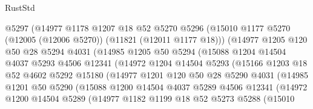 \begin{lexlean}{RustStd}
\begin{coremodule}
                    @5297
                    (@14977
                      @1178
                      @1207
                      @18
                      @52
                      @5270
                      @5296
                      (@15010 @1177 @5270 (@12005 (@12006 @5270)) (@11821 (@12011 @1177 @18)))
                      (@14977
                        @1205
                        @120
                        @50
                        @28
                        @5294
                        @4031
                        (@14985
                          @1205
                          @50
                          @5294
                          (@15088
                            @1204
                            @14504
                            @4037
                            @5293
                            @4506
                            @12341
                            (@14972
                              @1204
                              @14504
                              @5293
                              (@15166
                                @1203
                                @18
                                @52
                                @4602
                                @5292
                                @15180
                                (@14977
                                  @1201
                                  @120
                                  @50
                                  @28
                                  @5290
                                  @4031
                                  (@14985
                                    @1201
                                    @50
                                    @5290
                                    (@15088
                                      @1200
                                      @14504
                                      @4037
                                      @5289
                                      @4506
                                      @12341
                                      (@14972
                                        @1200
                                        @14504
                                        @5289
                                        (@14977
                                          @1182
                                          @1199
                                          @18
                                          @52
                                          @5273
                                          @5288
                                          (@15010

\end{coremodule}
\end{lexlean}
